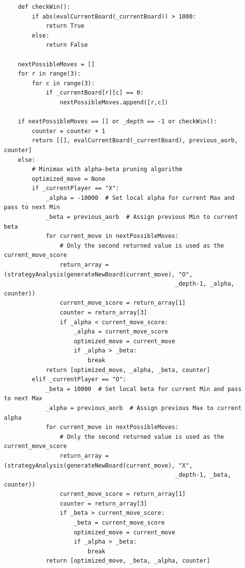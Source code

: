 \documentclass[titlepage]{article}
\begin{document}
\begin{verbatim}
    def checkWin():
        if abs(evalCurrentBoard(_currentBoard)) > 1000:
            return True
        else:
            return False

    nextPossibleMoves = []
    for r in range(3):
        for c in range(3):
            if _currentBoard[r][c] == 0:
                nextPossibleMoves.append([r,c])

    if nextPossibleMoves == [] or _depth == -1 or checkWin():
        counter = counter + 1
        return [[], evalCurrentBoard(_currentBoard), previous_aorb, counter]
    else:
        # Minimax with alpha-beta pruning algorithm
        optimized_move = None
        if _currentPlayer == "X":
            _alpha = -10000  # Set local alpha for current Max and pass to next Min
            _beta = previous_aorb  # Assign previous Min to current beta
            for current_move in nextPossibleMoves:
                # Only the second returned value is used as the current_move_score
                return_array = (strategyAnalysis(generateNewBoard(current_move), "O", 
                                                 _depth-1, _alpha, counter))
                current_move_score = return_array[1]
                counter = return_array[3]
                if _alpha < current_move_score:
                    _alpha = current_move_score
                    optimized_move = current_move
                    if _alpha > _beta:
                        break
            return [optimized_move, _alpha, _beta, counter]
        elif _currentPlayer == "O":
            _beta = 10000  # Set local beta for current Min and pass to next Max
            _alpha = previous_aorb  # Assign previous Max to current alpha
            for current_move in nextPossibleMoves:
                # Only the second returned value is used as the current_move_score
                return_array = (strategyAnalysis(generateNewBoard(current_move), "X", 
                                                 _depth-1, _beta, counter))
                current_move_score = return_array[1]
                counter = return_array[3]
                if _beta > current_move_score:
                    _beta = current_move_score
                    optimized_move = current_move
                    if _alpha > _beta:
                        break
            return [optimized_move, _beta, _alpha, counter]



\end{verbatim}
\end{document}
